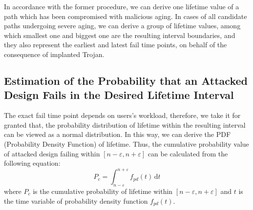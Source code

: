 In accordance with the former procedure, we can derive one lifetime value of a path which has been compromised with malicious aging. In cases of all candidate paths undergoing severe aging, we can derive a group of lifetime values, among which smallest one and biggest one are the resulting interval boundaries, and they also represent the earliest and latest fail time points, on behalf of the consequence of implanted Trojan.

\subsection{Estimation of the Probability that an Attacked Design Fails in the Desired Lifetime Interval}
The exact fail time point depends on users's workload, therefore, we take it for granted that, the probability distribution of lifetime within the resulting interval can be viewed as a normal distribution. In this way, we can derive the PDF (Probability Density Function) of lifetime. Thus, the cumulative probability value of attacked design failing within $[n-\varepsilon, n+\varepsilon]$ can be calculated from the following equation:
\begin{equation}
	\label{eq:pdf}
		P_{c} = \int_{n-\varepsilon}^{n+\varepsilon} f_{pd}(t) \,\mathrm{d}t
\end{equation}
where $P_{c}$ is the cumulative probability of lifetime within $[n-\varepsilon, n+\varepsilon]$ and $t$ is the time variable of probability density function $f_{pd}(t)$.

  
